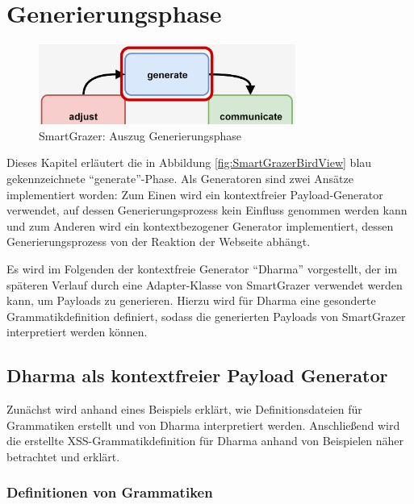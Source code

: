 \section{Generierungsphase}

\begin{figure}[htbp] 
	\centering
	\includegraphics[width=0.75\textwidth]{contents/images/SmartGrazerSectionGenerate}
	\caption{SmartGrazer: Auszug Generierungsphase}
	\label{fig:SmartGrazerSectionGenerate}
\end{figure}

Dieses Kapitel erläutert die in Abbildung \ref{fig:SmartGrazerBirdView} blau gekennzeichnete ``generate''-Phase. Als Generatoren sind zwei Ansätze implementiert worden: Zum Einen wird ein kontextfreier Payload-Generator verwendet, auf dessen Generierungsprozess kein Einfluss genommen werden kann und zum Anderen wird ein kontextbezogener Generator implementiert, dessen Generierungsprozess von der Reaktion der Webseite abhängt.

Es wird im Folgenden der kontextfreie Generator ``Dharma'' vorgestellt, der im späteren Verlauf durch eine \gls{Adapter}-Klasse von SmartGrazer verwendet werden kann, um Payloads zu generieren. Hierzu wird für Dharma eine gesonderte Grammatikdefinition definiert, sodass die generierten Payloads von SmartGrazer interpretiert werden können.

\FloatBarrier


\subsection{Dharma als kontextfreier Payload Generator}\label{Dharma}

Zunächst wird anhand eines Beispiels erklärt, wie Definitionsdateien für Grammatiken erstellt und von Dharma interpretiert werden. Anschließend wird die erstellte XSS-Grammatikdefinition für Dharma anhand von Beispielen näher betrachtet und erklärt.

\subsubsection{Definitionen von Grammatiken}

